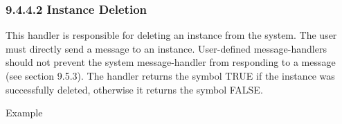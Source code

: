 \documentclass[letterpaper,10pt,english]{sphinxmanual}
\begin{document}
\subsubsection{9.4.4.2 Instance Deletion}
\label{\detokenize{cool:instance-deletion}}

\begin{sphinxVerbatim}[commandchars=\\\{\}]
    
\end{sphinxVerbatim}

This handler is responsible for deleting an instance from the system.
The user must directly send a  message to an instance.
User-defined  message-handlers should not prevent the system
message-handler from responding to a  message (see section
9.5.3). The handler returns the symbol TRUE if the instance was
successfully deleted, otherwise it returns the symbol FALSE.

Example

\begin{sphinxVerbatim}[commandchars=\\\{\}]
  \PYG{p}{[}\PYG{p}{]} 
    
      
 
      
  
     
\end{sphinxVerbatim}
\end{document}

